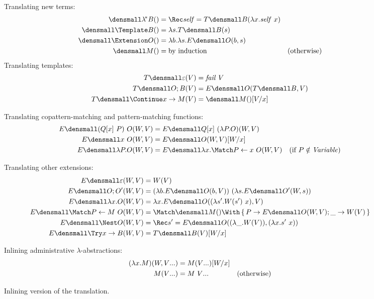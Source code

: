 \documentclass[runningheads]{llncs}
\begin{document}
\begin{figure}
\centering
Translating new terms:  
\begin{align*}
  \den{\lamstar B}()
  &=
  \Rec \mathit{self} = T\den{B}(\lambda x. \mathit{self} ~ x)
  \\
  \den{\Template B}()
  &=
  \lambda s. T\den{B}(s)
  \\
  \den{\Extension O}()
  &=
  \lambda b. \lambda s. E\den{O}(b, s)
  \\
  \den{M}()
  &=
  \text{by induction}
  &(\text{otherwise})
\end{align*}
Translating templates:
\begin{align*}
  T\den{\varepsilon}(V)
  &=
  \mathit{fail}~V
  \\
  T\den{O; B}(V)
  &=
  E\den{O}(T\den{B}, V)
  \\
  T\den{\Continue x \to M}(V)
  &=
  \den{M}()\subst{x}{V}
\end{align*}

Translating copattern-matching and pattern-matching functions:
\begin{align*}
  E\den{(Q[x] ~ P) ~ O}(W, V)
  &=
  E\den{Q[x] ~ (\lambda P. O)}(W, V)
  \\
  E\den{x ~ O}(W, V)
  &=
  E\den{O}(W, V)\subst{x}{W}
  \\
  E\den{\lambda P. O}(W, V)
  &=
  E\den{\lambda x. \Match P \gets x ~ O}(W, V)
  &(\text{if } P \notin \mathit{Variable})
\end{align*}

Translating other extensions:
\begin{align*}
  E\den{\varepsilon}(W, V)
  &=
  W(V)
  \\
  E\den{O; O'}(W, V)
  &=
  (\lambda b. E\den{O}(b, V)) ~ (\lambda s. E\den{O'}(W, s))
  \\
  E\den{\lambda x. O}(W, V)
  &=
  \lambda x. E\den{O}((\lambda s'. W(s') ~ x), V)
  \\
  E\den{\Match P \gets M ~ O}(W, V)
  &=
  \Match \den{M}() \With
  \set{P \to E\den{O}(W, V); \_ \to W(V)}
  \\
  E\den{\Nest O}(W, V)
  &=
  \Rec s' = E\den{O}((\lambda \_. W(V)), (\lambda x. s' ~ x))
  \\
  E\den{\Try x \to B}(W, V)
  &=
  T\den{B}(V)\subst{x}{W}
\end{align*}

Inlining administrative $\lambda$-abstractions:
\begin{align*}
  (\lambda x. M)(W, \many{V})
  &=
  M(\many{V})\subst{x}{W}
  \\
  M(\many{V})
  &=
  M ~ \many{V}
  &(\text{otherwise})
\end{align*}

\caption{Inlining version of the translation.}
\label{fig:inline-translation}
\end{figure}
\end{document}
